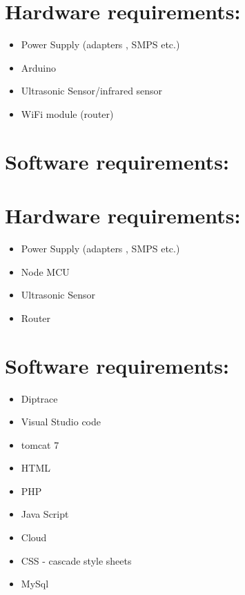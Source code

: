 \documentclass[]{article}
\begin{document}
\section[]{Hardware requirements:}
\begin{itemize}
	\item Power Supply (adapters , SMPS etc.)
	\item Arduino
	\item Ultrasonic Sensor/infrared sensor
	\item WiFi module (router)
\end{itemize}

\section{Software requirements:}
\section[]{Hardware requirements:}
\begin{itemize}
	\item Power Supply (adapters , SMPS etc.)
	\item Node MCU
	\item Ultrasonic Sensor
	\item Router
\end{itemize}

\section{Software requirements:}
\begin{itemize}
\item Diptrace
\item Visual Studio code
\item tomcat 7
\item HTML
\item PHP
\item Java Script
\item Cloud
\item CSS - cascade style sheets
\item MySql	
\end{itemize}
\end{document}
